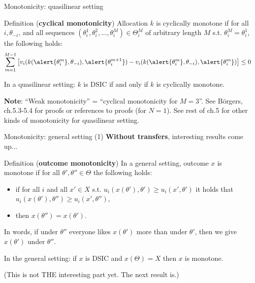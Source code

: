 \documentclass[english,10pt
,aspectratio=169
]{beamer}
\begin{document}
\begin{frame}{Monotonicity: quasilinear setting}
	\begin{exampleblock}{Definition (\textbf{cyclical monotonicity})}
		Allocation $k$ is \alert{cyclically monotone} if for all $i,\theta_{-i}$, and all sequences $(\theta_i^1,\theta_i^2,...,\theta_i^M)\in \Theta_i^M$ of arbitrary length $M$ s.t. $\theta_i^M=\theta_i^1$, the following holds:
		\begin{equation*}
			\sum_{m=1}^{M-1}
			\left[
			v_{i}(k(\alert{\theta_{i}^m}, \theta_{-i}), \alert{\theta_{i}^{m+1}}) - 
			v_{i}(k(\alert{\theta_{i}^{m}}, \theta_{-i}), \alert{\theta_{i}^m}) 
			\right] 
			\leq 0
		\end{equation*}
	\end{exampleblock}
	\begin{theorem}
		In a quasilinear setting: $k$ is DSIC if and only if $k$ is cyclically monotone.
	\end{theorem}
	\textbf{Note}: ``Weak monotonicity'' = ``cyclical monotonicity for $M=3$''.
	See B{\"o}rgers, ch.5.3-5.4 for proofs or references to proofs (for $N=1$). See rest of ch.5 for other kinds of monotonicity for quasilinear setting.
\end{frame}


\begin{frame}{Monotonicity: general setting (1)}
	\textbf{Without transfers}, interesting results come up... 
	\begin{exampleblock}{Definition (\textbf{outcome monotonicity})}
		In a general setting, outcome $x$ is \alert{monotone} if for all $\theta',\theta'' \in \Theta$ the following holds:
		\begin{itemize}
			\item if for all $i$ and all $x' \in X$ s.t. $u_i(x(\theta'),\theta') \geq u_i(x',\theta')$ it holds that $u_i(x(\theta'),\theta'') \geq u_i(x',\theta'')$,
			\item then $x(\theta'')=x(\theta')$.
		\end{itemize}
	\end{exampleblock}
	In words, if under $\theta''$ everyone likes $x(\theta')$ more than under $\theta'$, then we give $x(\theta')$ under $\theta''$.
	\begin{theorem}
		In the general setting: if $x$ is DSIC and $x(\Theta)=X$ then $x$ is monotone.
	\end{theorem}
	(This is not THE interesting part yet. The next result is.)
\end{frame}
\end{document}
